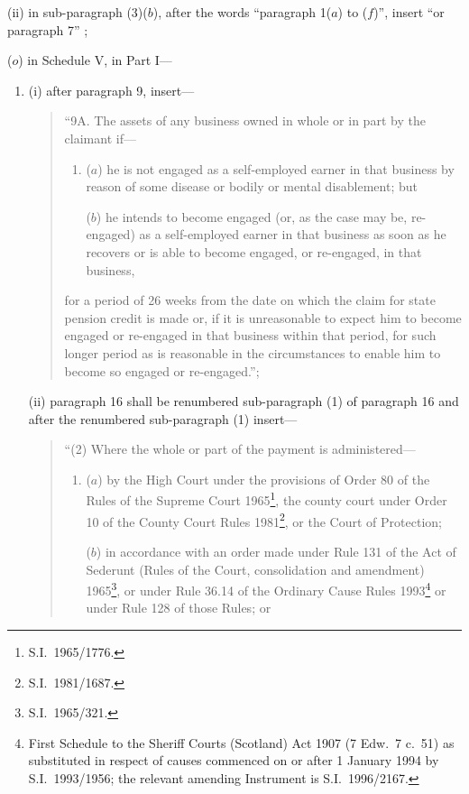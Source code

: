 \documentclass[12pt,a4paper]{article}
\begin{document}
\begin{enumerate}
\begin{enumerate}
(ii) in sub-paragraph (3)($b$), after the words “paragraph 1($a$)  to ($f$)”, insert “or paragraph 7” ;
\end{enumerate}

($o$) in Schedule V, in Part I—
\begin{enumerate}\item[]
(i) after paragraph 9, insert—
\begin{quotation}
“9A.  The assets of any business owned in whole or in part by the claimant if—
\begin{enumerate}\item[]
($a$) he is not engaged as a self-employed earner in that business by reason of some disease or bodily or mental disablement; but

($b$) he intends to become engaged (or, as the case may be, re-engaged) as a self-employed earner in that business as soon as he recovers or is able to become engaged, or re-engaged, in that business,
\end{enumerate}
for a period of 26 weeks from the date on which the claim for state pension credit is made or, if it is unreasonable to expect him to become engaged or re-engaged in that business within that period, for such longer period as is reasonable in the circumstances to enable him to become so engaged or re-engaged.”;
\end{quotation}

(ii) paragraph 16 shall be renumbered sub-paragraph (1) of paragraph 16 and after the renumbered sub-paragraph (1) insert—
\begin{quotation}
“(2) Where the whole or part of the payment is administered—
\begin{enumerate}\item[]
($a$) by the High Court under the provisions of Order 80 of the Rules of the Supreme Court 1965\footnote{S.I.\ 1965/1776.}, the county court under Order 10 of the County Court Rules 1981\footnote{S.I.\ 1981/1687.}, or the Court of Protection;

($b$) in accordance with an order made under Rule 131 of the Act of Sederunt (Rules of the Court, consolidation and amendment) 1965\footnote{S.I.\ 1965/321.}, or under Rule 36.14 of the Ordinary Cause Rules 1993\footnote{First Schedule to the Sheriff Courts (Scotland) Act 1907 (7 Edw.\ 7 c.\ 51) as substituted in respect of causes commenced on or after 1 January 1994 by S.I.\ 1993/1956; the relevant amending Instrument is S.I.\ 1996/2167.} or under Rule 128 of those Rules; or


\end{enumerate}
\end{quotation}
\end{enumerate}
\end{enumerate}
\end{document}
